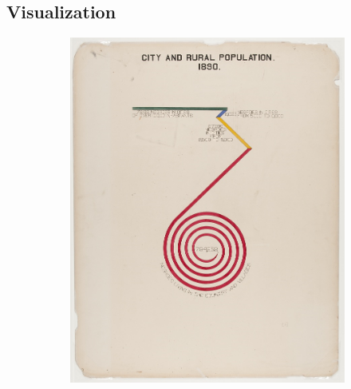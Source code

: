 \subsection{Visualization}

\begin{figure}[H]
    \begin{subfigure}{.24\textwidth}
        \includegraphics[width=1\textwidth]{figures/intro/du_bois_spinny.png}
        \caption{}
        \label{fig:intro_dpa}
    \end{subfigure}
    \begin{subfigure}{.24\textwidth}

\end{subfigure}
\end{figure}
